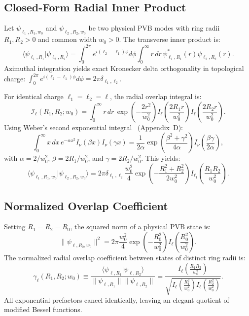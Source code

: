 \documentclass[11pt,a4paper]{article}
\begin{document}
\subsection{Closed-Form Radial Inner Product}

Let $\psi_{\ell_1, R_1, w_0}$ and $\psi_{\ell_2, R_2, w_0}$ be two physical PVB modes with ring radii $R_1, R_2 > 0$ and common width $w_0 > 0$. The transverse inner product is:
\begin{equation}
\langle \psi_{\ell_1, R_1} | \psi_{\ell_2, R_2} \rangle = \int_0^{2\pi} e^{i(\ell_2 - \ell_1)\phi} d\phi \int_0^\infty r \, dr \, \psi_{\ell_1, R_1}^*(r) \psi_{\ell_2, R_2}(r).
\end{equation}
Azimuthal integration yields exact Kronecker delta orthogonality in topological charge: $\int_0^{2\pi} e^{i(\ell_2 - \ell_1)\phi} d\phi = 2\pi \delta_{\ell_1, \ell_2}$.

For identical charge $\ell_1 = \ell_2 = \ell$, the radial overlap integral is:
\begin{equation}
\mathcal{I}_\ell(R_1, R_2; w_0) = \int_0^\infty r \, dr \, \exp\left(-\frac{2 r^2}{w_0^2}\right) I_\ell\left(\frac{2 R_1 r}{w_0^2}\right) I_\ell\left(\frac{2 R_2 r}{w_0^2}\right).
\end{equation}
Using Weber's second exponential integral~\cite{Gradshteyn2014} (Appendix~D):
\begin{equation}
\int_0^\infty x \, dx \, e^{-\alpha x^2} I_\nu(\beta x) I_\nu(\gamma x) = \frac{1}{2\alpha} \exp\left(\frac{\beta^2 + \gamma^2}{4\alpha}\right) I_\nu\left(\frac{\beta \gamma}{2\alpha}\right),
\end{equation}
with $\alpha = 2/w_0^2$, $\beta = 2 R_1 / w_0^2$, and $\gamma = 2 R_2 / w_0^2$. This yields:
\begin{equation}
\boxed{\langle \psi_{\ell_1, R_1, w_0} | \psi_{\ell_2, R_2, w_0} \rangle = 2\pi \delta_{\ell_1, \ell_2} \frac{w_0^2}{4} \exp\left(-\frac{R_1^2 + R_2^2}{2 w_0^2}\right) I_{\ell_1}\left(\frac{R_1 R_2}{w_0^2}\right).}
\label{eq:exact_inner_product}
\end{equation}

\subsection{Normalized Overlap Coefficient}

Setting $R_1 = R_2 = R_0$, the squared norm of a physical PVB state is:
\begin{equation}
\|\psi_{\ell, R_0, w_0}\|^2 = 2\pi \frac{w_0^2}{4} \exp\left(-\frac{R_0^2}{w_0^2}\right) I_\ell\left(\frac{R_0^2}{w_0^2}\right).
\end{equation}
The normalized radial overlap coefficient between states of distinct ring radii is:
\begin{equation}
\gamma_\ell(R_1, R_2; w_0) \equiv \frac{\langle \psi_{\ell, R_1} | \psi_{\ell, R_2} \rangle}{\|\psi_{\ell, R_1}\| \|\psi_{\ell, R_2}\|} = \frac{I_\ell\left(\frac{R_1 R_2}{w_0^2}\right)}{\sqrt{I_\ell\left(\frac{R_1^2}{w_0^2}\right) I_\ell\left(\frac{R_2^2}{w_0^2}\right)}}.
\label{eq:normalized_overlap}
\end{equation}
All exponential prefactors cancel identically, leaving an elegant quotient of modified Bessel functions.
\end{document}
